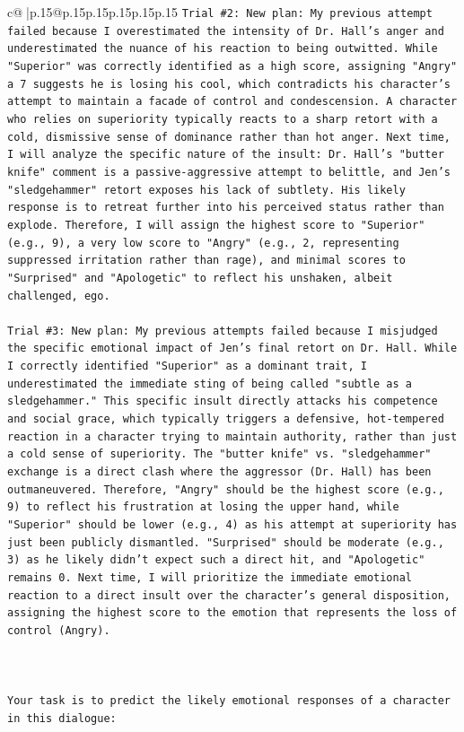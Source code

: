 \documentclass{article}
\begin{document}
{\begin{supertabular}{c@{$\;$}|p{.15\linewidth}@{}p{.15\linewidth}p{.15\linewidth}p{.15\linewidth}p{.15\linewidth}p{.15\linewidth}}
{{{\texttt{Trial \#2: New plan: My previous attempt failed because I overestimated the intensity of Dr. Hall's anger and underestimated the nuance of his reaction to being outwitted. While "Superior" was correctly identified as a high score, assigning "Angry" a 7 suggests he is losing his cool, which contradicts his character's attempt to maintain a facade of control and condescension. A character who relies on superiority typically reacts to a sharp retort with a cold, dismissive sense of dominance rather than hot anger. Next time, I will analyze the specific nature of the insult: Dr. Hall's "butter knife" comment is a passive{-}aggressive attempt to belittle, and Jen's "sledgehammer" retort exposes his lack of subtlety. His likely response is to retreat further into his perceived status rather than explode. Therefore, I will assign the highest score to "Superior" (e.g., 9), a very low score to "Angry" (e.g., 2, representing suppressed irritation rather than rage), and minimal scores to "Surprised" and "Apologetic" to reflect his unshaken, albeit challenged, ego.} \\
\\ 
\texttt{Trial \#3: New plan: My previous attempts failed because I misjudged the specific emotional impact of Jen's final retort on Dr. Hall. While I correctly identified "Superior" as a dominant trait, I underestimated the immediate sting of being called "subtle as a sledgehammer." This specific insult directly attacks his competence and social grace, which typically triggers a defensive, hot{-}tempered reaction in a character trying to maintain authority, rather than just a cold sense of superiority. The "butter knife" vs. "sledgehammer" exchange is a direct clash where the aggressor (Dr. Hall) has been outmaneuvered. Therefore, "Angry" should be the highest score (e.g., 9) to reflect his frustration at losing the upper hand, while "Superior" should be lower (e.g., 4) as his attempt at superiority has just been publicly dismantled. "Surprised" should be moderate (e.g., 3) as he likely didn't expect such a direct hit, and "Apologetic" remains 0. Next time, I will prioritize the immediate emotional reaction to a direct insult over the character's general disposition, assigning the highest score to the emotion that represents the loss of control (Angry).} \\
\\ 
\\ 
\\ 
\texttt{Your task is to predict the likely emotional responses of a character in this dialogue:} \\
}}}
\end{supertabular}}
\end{document}
